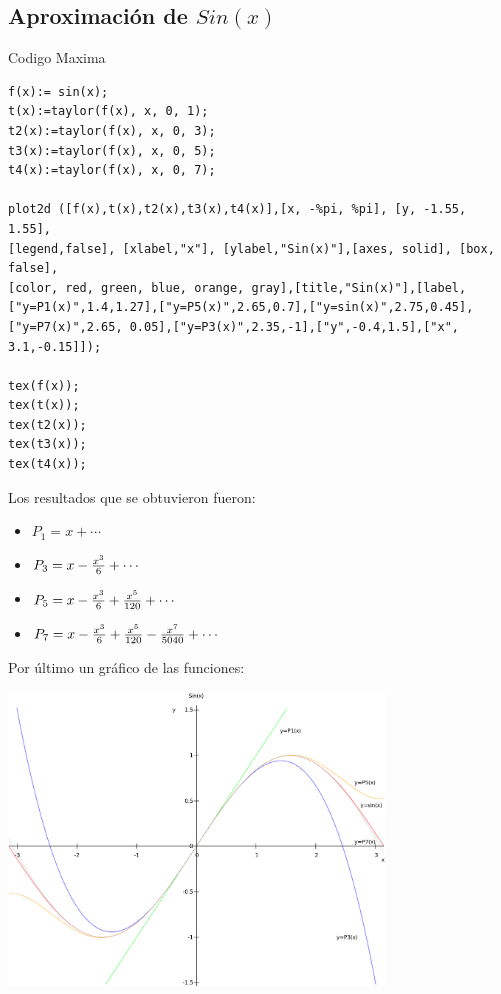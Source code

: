 \documentclass[12pt]{article}
\begin{document}
\subsection{Aproximación de $Sin(x)$}
Codigo Maxima
\begin{verbatim}
f(x):= sin(x);
t(x):=taylor(f(x), x, 0, 1);
t2(x):=taylor(f(x), x, 0, 3);
t3(x):=taylor(f(x), x, 0, 5);
t4(x):=taylor(f(x), x, 0, 7);

plot2d ([f(x),t(x),t2(x),t3(x),t4(x)],[x, -%pi, %pi], [y, -1.55, 1.55],
[legend,false], [xlabel,"x"], [ylabel,"Sin(x)"],[axes, solid], [box, false],
[color, red, green, blue, orange, gray],[title,"Sin(x)"],[label,
["y=P1(x)",1.4,1.27],["y=P5(x)",2.65,0.7],["y=sin(x)",2.75,0.45],
["y=P7(x)",2.65, 0.05],["y=P3(x)",2.35,-1],["y",-0.4,1.5],["x", 3.1,-0.15]]);

tex(f(x));
tex(t(x));
tex(t2(x));
tex(t3(x));
tex(t4(x));
\end{verbatim}
Los resultados que se obtuvieron fueron:
\begin{itemize}
\item{$P_1=x+\cdots $}
\item{$P_3=x-{{x^3}\over{6}}+\cdots $}
\item{$P_5=x-{{x^3}\over{6}}+{{x^5}\over{120}}+\cdots$}
\item{$P_7=x-{{x^3}\over{6}}+{{x^5}\over{120}}-{{x^7}\over{5040}}+\cdots $}
\end{itemize}
Por último un gráfico de las funciones:
\begin{center}
\includegraphics[width=10cm]{TaylorSin(x)}
\end{center}
\pagebreak
\end{document}
